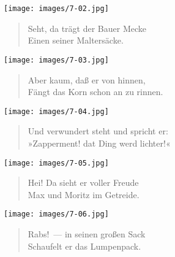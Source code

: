 \documentclass[a4paper,12pt]{article}
\begin{document}
\begin{center}\texttt{[image: images/7-02.jpg]}\end{center}



\begin{verse}
Seht, da trägt der Bauer Mecke\\{}
Einen seiner Maltersäcke.
\end{verse}



\begin{center}\texttt{[image: images/7-03.jpg]}\end{center}



\begin{verse}
Aber kaum, daß er von hinnen,\\{}
Fängt das Korn schon an zu rinnen.
\end{verse}



\begin{center}\texttt{[image: images/7-04.jpg]}\end{center}



\begin{verse}
Und verwundert steht und spricht er:\\{}
»Zapperment! dat Ding werd lichter!«
\end{verse}



\begin{center}\texttt{[image: images/7-05.jpg]}\end{center}



\begin{verse}
Hei! Da sieht er voller Freude\\{}
Max und Moritz im Getreide.
\end{verse}



\begin{center}\texttt{[image: images/7-06.jpg]}\end{center}



\begin{verse}
Rabs!~— in seinen großen Sack\\{}
Schaufelt er das Lumpenpack.
\end{verse}
\end{document}
